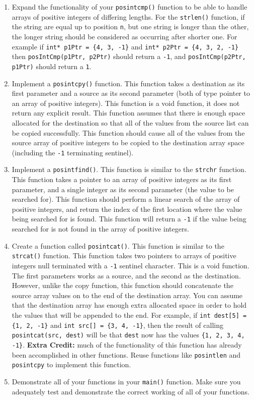 \documentclass[11pt]{article}
\begin{document}
\begin{enumerate}
\item Expand the functionality of your \verb~posintcmp()~ function to be able
to handle arrays of positive integers of differing lengths.  For
the \verb~strlen()~ function, if the string are equal up to position \verb~n~,
but one string is longer than the other, the longer string should
be considered as occurring after shorter one.  For example if
\verb~int* p1Ptr = {4, 3, -1}~ and \verb~int* p2Ptr = {4, 3, 2, -1}~
then \verb~posIntCmp(p1Ptr, p2Ptr)~ should return a \verb~-1~, and
\verb~posIntCmp(p2Ptr, p1Ptr)~ should return a \verb~1~.

\item Implement a \verb~posintcpy()~ function.  This function takes a
destination as its first parameter and a source as its second
parameter (both of type pointer to an array of positive integers).
This function is a void function, it does not return any explicit
result.  This function assumes that there is enough space allocated
for the destination so that all of the values from the source list
can be copied successfully.  This function should cause all of the
values from the source array of positive integers to be copied to
the destination array space (including the \verb~-1~ terminating
sentinel).

\item Implement a \verb~posintfind()~.  This function is similar to the
\verb~strchr~ function.  This function takes a pointer to an array of
positive integers as its first parameter, and a single integer as
its second parameter (the value to be searched for).  This function
should perform a linear search of the array of positive integers,
and return the index of the first location where the value being
searched for is found.  This function will return a \verb~-1~ if the
value being searched for is not found in the array of positive
integers.

\item Create a function called \verb~posintcat()~.  This function is similar
to the \verb~strcat()~ function.  This function takes two pointers to
arrays of positive integers null terminated with a \verb~-1~ sentinel
character.  This is a void function.  The first parameters works as
a source, and the second as the destination.  However, unlike the
copy function, this function should concatenate the source array
values on to the end of the destination array.  You can assume that
the destination array has enough extra allocated space in order to
hold the values that will be appended to the end.  For example, if
\verb~int dest[5] = {1, 2, -1}~ and \verb~int src[] = {3, 4, -1}~, then the
result of calling \verb~posintcat(src, dest)~ will be that \verb~dest~
now has the values \verb~{1, 2, 3, 4, -1}~.  \textbf{Extra Credit:} much of
the functionality of this function has already been accomplished
in other functions.  Reuse functions like \verb~posintlen~ and
\verb~posintcpy~ to implement this function.

\item Demonstrate all of your functions in your \verb~main()~ function.  Make
sure you adequately test and demonstrate the correct working of all
of your functions.
\end{enumerate}
\end{document}
